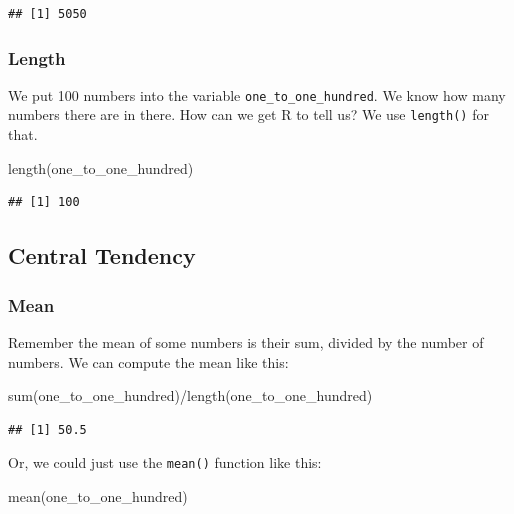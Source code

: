 \documentclass[
]{book}
\newenvironment{Shaded}{\begin{snugshade}}{\end{snugshade}}
\newcommand{\FunctionTok}[1]{\textcolor[rgb]{0.00,0.00,0.00}{#1}}
\newcommand{\NormalTok}[1]{#1}
\newcommand{\SpecialCharTok}[1]{\textcolor[rgb]{0.00,0.00,0.00}{#1}}
\begin{document}
\begin{verbatim}
## [1] 5050
\end{verbatim}

\hypertarget{length}{%
\subsubsection{Length}\label{length}}

We put 100 numbers into the variable \texttt{one\_to\_one\_hundred}. We know how many numbers there are in there. How can we get R to tell us? We use \texttt{length()} for that.

\begin{Shaded}
\begin{Highlighting}[]
\FunctionTok{length}\NormalTok{(one\_to\_one\_hundred)}
\end{Highlighting}
\end{Shaded}

\begin{verbatim}
## [1] 100
\end{verbatim}

\hypertarget{central-tendency}{%
\subsection{Central Tendency}\label{central-tendency}}

\hypertarget{mean}{%
\subsubsection{Mean}\label{mean}}

Remember the mean of some numbers is their sum, divided by the number of numbers. We can compute the mean like this:

\begin{Shaded}
\begin{Highlighting}[]
\FunctionTok{sum}\NormalTok{(one\_to\_one\_hundred)}\SpecialCharTok{/}\FunctionTok{length}\NormalTok{(one\_to\_one\_hundred)}
\end{Highlighting}
\end{Shaded}

\begin{verbatim}
## [1] 50.5
\end{verbatim}

Or, we could just use the \texttt{mean()} function like this:

\begin{Shaded}
\begin{Highlighting}[]
\FunctionTok{mean}\NormalTok{(one\_to\_one\_hundred)}
\end{Highlighting}
\end{Shaded}
\end{document}
